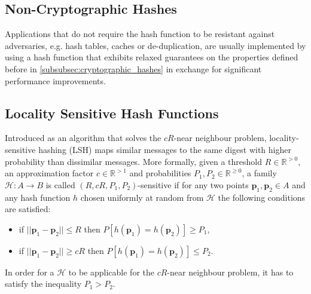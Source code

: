 \subsection{Non-Cryptographic Hashes} \label{subsubsec:non-cryptographic-hashes}
Applications that do not require the hash function to be resistant against adversaries, e.g. hash tables, caches or de-duplication, are usually implemented by using a hash function that exhibits relaxed guarantees on the properties defined before in \ref{subsubsec:cryptographic_hashes} in exchange for significant performance improvements.

\subsection{Locality Sensitive Hash Functions}
Introduced as an algorithm that solves the $cR$-near neighbour problem, locality-sensitive hashing (LSH) \cite{indyk_approximate_1998} maps similar messages to the same digest with higher probability than dissimilar messages. More formally, given a threshold $R \in \mathbb{R}^{>0}$, an approximation factor $c \in \mathbb{R}^{>1}$ and probabilities $P_1, P_2 \in \mathbb{R}^{\geq 0}$, a family $\mathcal{H}: A \rightarrow B$ is called $(R, cR, P_1, P_2)$-sensitive if for any two points $\bm{p}_1, \bm{p}_2 \in A$ and any hash function $h$ chosen uniformly at random from $\mathcal{H}$ the following conditions are satisfied:

\begin{itemize}
    \item if $|| \bm{p}_1 - \bm{p}_2 || \leq R$ then $P[h(\bm{p}_1)=h(\bm{p}_2)] \geq P_1$,
    \item if $|| \bm{p}_1 - \bm{p}_2 || \geq cR$ then $P[h(\bm{p}_1)=h(\bm{p}_2)] \leq P_2$.
\end{itemize}

In order for a $\mathcal{H}$ to be applicable for the $cR$-near neighbour problem, it has to satisfy the inequality $P_1 > P_2$.